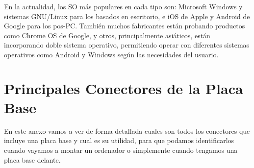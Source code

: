 En la actualidad, los SO más populares en cada tipo son: Microsoft Windows y sistemas GNU/Linux para los basados en escritorio, e iOS de Apple y Android de Google para los pos-PC. También muchos fabricantes están probando productos como Chrome OS de Google, y otros, principalmente asiáticos, están incorporando doble sistema operativo, permitiendo operar con diferentes sistemas operativos como Android y Windows según las necesidades del usuario.

\section{Principales Conectores de la Placa Base}
En este anexo vamos a ver de forma detallada cuales son todos los conectores que incluye una placa base y cual es su utilidad, para que podamos identificarlos cuando vayamos a montar un ordenador o simplemente cuando tengamos una placa base delante.

